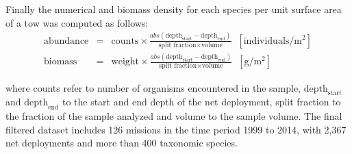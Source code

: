 \documentclass[letterpaper,portrait,11pt]{scrartcl}
\numberwithin{equation}{section}		%
\numberwithin{figure}{section}		%
\numberwithin{table}{section}				%
\begin{document}
\begin{appendices}
Finally the numerical and biomass density for each species per unit surface area of a tow was computed as follows: 
\begin{eqnarray*}
\text{abundance} &=& \text{counts} \times \frac{  abs( \text{depth}_{\text{start}} - \text{depth}_{\text{end}} ) } { \text{split fraction} \times \text{volume} } \; \; [\text{individuals}/ \text{m}^{2} ]  \\
\text{biomass} &=& \text{weight} \times \frac{ abs( \text{depth}_{\text{start}} - \text{depth}_{\text{end}} )} { \text{split fraction} \times \text{volume}} \; \; [\text{g}/\text{m}^2]
\end{eqnarray*}

where counts refer to number of organisms encountered in the sample, $\text{depth}_{\text{start}}$ and $\text{depth}_{\text{end}}$ to the start and end depth of the net deployment, split fraction to the fraction of the sample analyzed and volume to the sample volume. The final filtered dataset includes 126 missions in the time period 1999 to 2014, with 2,367 net deployments and more than 400 taxonomic species. 

\end{appendices}
\end{document}
